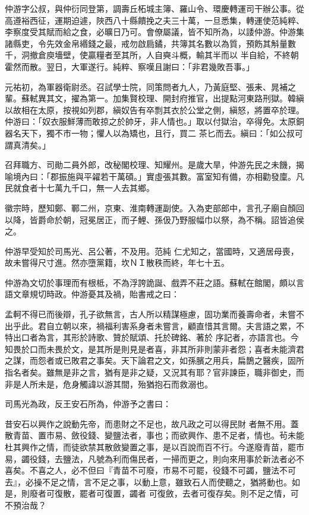 \begin{pinyinscope}
 仲游字公叔，與仲衍同登第，調壽丘柘城主簿、羅山令、環慶轉運司干辦公事。從高遵裕西征，運期迫遽，陜西八十縣饋挽之夫三十萬，一旦悉集，轉運使范純粹、李察度受其賦而給之食，必曠日乃可。會僚屬議，皆不知所為，以諉仲游。仲游集諸縣吏，令先效金帛緡錢之最，戒勿啟扃鐍，共簿其名數以為質，預飭其斛量數千，洞撤倉庾墻壁，使贏糧者至其所，人自奭斗概，輸其半而以
 半自給，不終朝霍然而散。翌日，大軍遂行。純粹、察嘆且謝曰：「非君幾敗吾事。」



 元祐初，為軍器衛尉丞。召試學士院，同策問者九人，乃黃庭堅、張耒、晁補之輩。蘇軾異其文，擢為第一。加集賢校理、開封府推官，出提點河東路刑獄。韓縝以故相在太原，按視如列郡，縝奴告有卒剽其衣於公堂之側，縝怒，將置卒於理。仲游曰：「奴衣服鮮薄而敢掠之於帥牙，非人情也。」取以付獄治，卒得免。太原銅器名天下，獨不市一物；懼人以為矯也，且行，買二
 茶匕而去。縝曰：「如公叔可謂真清矣。」



 召拜職方、司勛二員外郎，改秘閣校理、知耀州。是歲大旱，仲游先民之未饑，揭喻境內曰：「郡振施與平糴若干萬碩。」實虛張其數。富室知有備，亦相勸發廩。凡民就食者十七萬九千口，無一人去其鄉。



 徽宗時，歷知鄭、鄆二州，京東、淮南轉運副使。入為吏部郎中，言孔子廟自顏回以降，皆爵命於朝，冠冕居正，而子鯉、孫伋乃野服幅巾以祭，為不稱。詔皆追侯之。



 仲游早受知於司馬光、呂公著，不及用。范純
 仁尤知之，當國時，又適居母喪，故未嘗得尺寸進。然亦墮黨籍，坎ＮＩ散秩而終，年七十五。



 仲游為文切於事理而有根柢，不為浮誇詭誕、戲弄不莊之語。蘇軾在館閣，頗以言語文章規切時政。仲游憂其及禍，貽書戒之曰：



 孟軻不得已而後辯，孔子欲無言，古人所以精謀極慮，固功業而養壽命者，未嘗不出乎此。君自立朝以來，禍福利害系身者未嘗言，顧直惜其言爾。夫言語之累，不特出口者為言，其形於詩歌、贊於賦頌、托於碑銘、著於
 序記者，亦語言也。今知畏於口而未畏於文，是其所是則見是者喜，非其所非則蒙非者怨；喜者未能濟君之謀，而怨者或已敗君之事矣。天下論君之文，如孫臏之用兵，扁鵲之醫疾，固所指名者矣。雖無是非之言，猶有是非之疑，又況其有耶？官非諫臣，職非御史，而非是人所未是，危身觸諱以游其間，殆猶抱石而救溺也。



 司馬光為政，反王安石所為，仲游予之書曰：



 昔安石以興作之說動先帝，而患財之不足也，故凡政之可以得民財
 者無不用。蓋散青苗、置市易、斂役錢、變鹽法者，事也；而欲興作、患不足者，情也。茍未能杜其興作之情，而徒欲禁其散斂變置之事，是以百說而百不行。今遂廢青苗，罷市易，蠲役錢，去鹽法，凡號為利而傷民者，一掃而更之，則向來用事於新法者必不喜矣。不喜之人，必不但曰『青苗不可廢，市易不可罷，役錢不可蠲，鹽法不可去』，必操不足之情，言不足之事，以動上意，雖致石人而使聽之，猶將動也。如是，則廢者可復散，罷者可復置，蠲者
 可復斂，去者可復存矣。則不足之情，可不預治哉？




\end{pinyinscope}
